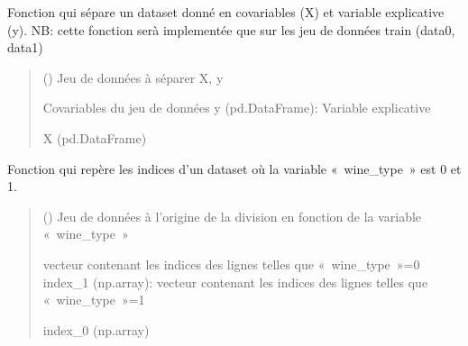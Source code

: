 \documentclass[letterpaper,10pt,french]{sphinxmanual}
\begin{document}
\begin{fulllineitems}
\label{\detokenize{dataset_division:dataset_division.treatment}}
\pysigstartsignatures
{}
\pysigstopsignatures
\sphinxAtStartPar
Fonction qui sépare un dataset donné en co\sphinxhyphen{}variables (X) et variable explicative (y).
NB: cette fonction serà implementée que sur les jeu de données train (data0, data1)
\begin{quote}\begin{description}
\sphinxAtStartPar
{} () \textendash{} Jeu de données à séparer X, y

\sphinxAtStartPar
Co\sphinxhyphen{}variables du jeu de données
y (pd.DataFrame): Variable explicative

\sphinxAtStartPar
X (pd.DataFrame)

\end{description}\end{quote}

\end{fulllineitems}


\begin{fulllineitems}
\label{\detokenize{dataset_division:dataset_division.winetype}}
\pysigstartsignatures
{}
\pysigstopsignatures
\sphinxAtStartPar
Fonction qui repère les indices d’un dataset où la variable « wine\_type » est 0 et 1.
\begin{quote}\begin{description}
\sphinxAtStartPar
{} () \textendash{} Jeu de données à l’origine de la division en fonction de la variable « wine\_type »

\sphinxAtStartPar
vecteur contenant les indices des lignes telles que « wine\_type »=0
index\_1 (np.array): vecteur contenant les indices des lignes telles que « wine\_type »=1

\sphinxAtStartPar
index\_0 (np.array)

\end{description}\end{quote}

\end{fulllineitems}
\end{document}
